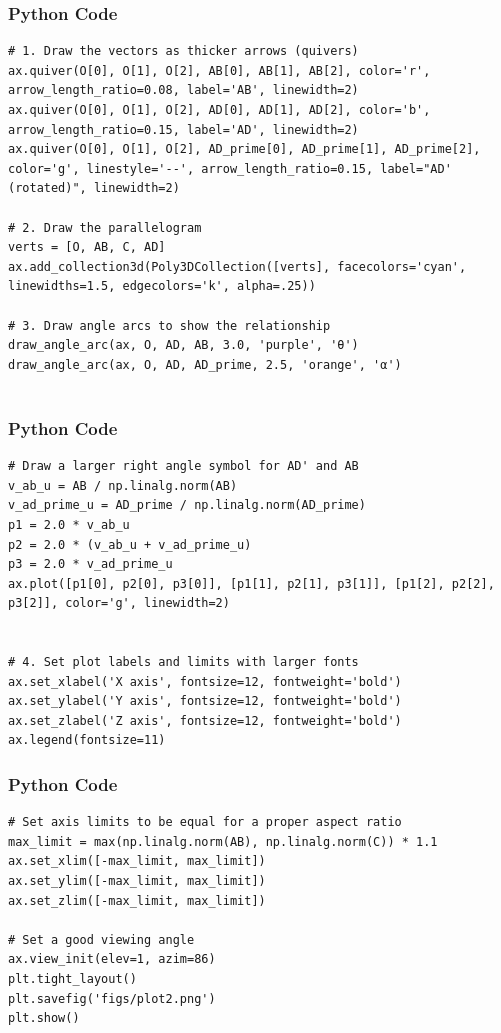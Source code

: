 \documentclass{beamer}
\begin{document}
\begin{frame}[fragile]
    \frametitle{Python Code }
    \begin{lstlisting}
# 1. Draw the vectors as thicker arrows (quivers)
ax.quiver(O[0], O[1], O[2], AB[0], AB[1], AB[2], color='r', arrow_length_ratio=0.08, label='AB', linewidth=2)
ax.quiver(O[0], O[1], O[2], AD[0], AD[1], AD[2], color='b', arrow_length_ratio=0.15, label='AD', linewidth=2)
ax.quiver(O[0], O[1], O[2], AD_prime[0], AD_prime[1], AD_prime[2], color='g', linestyle='--', arrow_length_ratio=0.15, label="AD' (rotated)", linewidth=2)

# 2. Draw the parallelogram
verts = [O, AB, C, AD]
ax.add_collection3d(Poly3DCollection([verts], facecolors='cyan', linewidths=1.5, edgecolors='k', alpha=.25))

# 3. Draw angle arcs to show the relationship
draw_angle_arc(ax, O, AD, AB, 3.0, 'purple', 'θ')
draw_angle_arc(ax, O, AD, AD_prime, 2.5, 'orange', 'α')


\end{lstlisting}
\end{frame}

\begin{frame}[fragile]
    \frametitle{Python Code }
    \begin{lstlisting}
# Draw a larger right angle symbol for AD' and AB
v_ab_u = AB / np.linalg.norm(AB)
v_ad_prime_u = AD_prime / np.linalg.norm(AD_prime)
p1 = 2.0 * v_ab_u
p2 = 2.0 * (v_ab_u + v_ad_prime_u)
p3 = 2.0 * v_ad_prime_u
ax.plot([p1[0], p2[0], p3[0]], [p1[1], p2[1], p3[1]], [p1[2], p2[2], p3[2]], color='g', linewidth=2)


# 4. Set plot labels and limits with larger fonts
ax.set_xlabel('X axis', fontsize=12, fontweight='bold')
ax.set_ylabel('Y axis', fontsize=12, fontweight='bold')
ax.set_zlabel('Z axis', fontsize=12, fontweight='bold')
ax.legend(fontsize=11)

\end{lstlisting}
\end{frame}

\begin{frame}[fragile]
    \frametitle{Python Code }
    \begin{lstlisting}
# Set axis limits to be equal for a proper aspect ratio
max_limit = max(np.linalg.norm(AB), np.linalg.norm(C)) * 1.1
ax.set_xlim([-max_limit, max_limit])
ax.set_ylim([-max_limit, max_limit])
ax.set_zlim([-max_limit, max_limit])

# Set a good viewing angle
ax.view_init(elev=1, azim=86)
plt.tight_layout()
plt.savefig('figs/plot2.png')
plt.show()

\end{lstlisting}
\end{frame}
\end{document}
